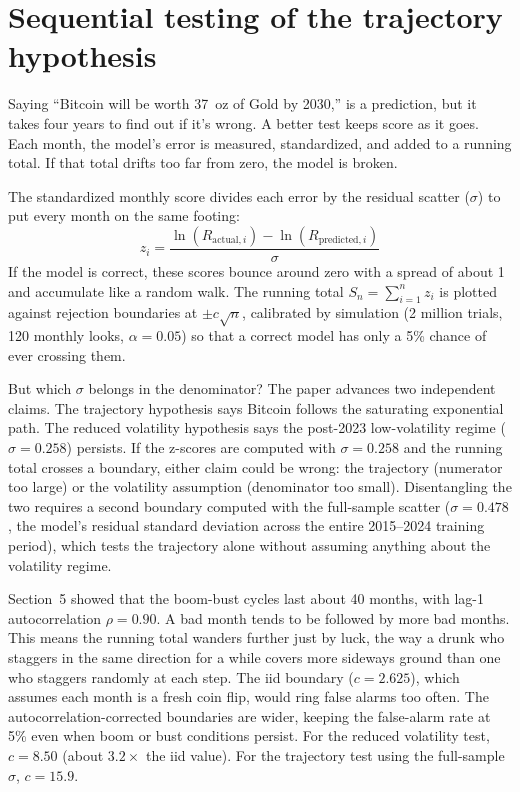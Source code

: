 \documentclass[11pt,letterpaper]{article}
\begin{document}
\section{Sequential testing of the trajectory hypothesis}

Saying ``Bitcoin will be worth 37~oz of Gold by 2030,'' is a prediction, but it takes four years to find out if it's wrong. A better test keeps score as it goes. Each month, the model's error is measured, standardized, and added to a running total. If that total drifts too far from zero, the model is broken.

The standardized monthly score divides each error by the residual scatter ($\sigma$) to put every month on the same footing:
\begin{equation}
z_i = \frac{\ln(R_{\text{actual},i}) - \ln(R_{\text{predicted},i})}{\sigma}
\label{eq:zscore}
\end{equation}
If the model is correct, these scores bounce around zero with a spread of about 1 and accumulate like a random walk. The running total $S_n = \sum_{i=1}^{n} z_i$ is plotted against rejection boundaries at $\pm c\sqrt{n}$, calibrated by simulation (2 million trials, 120 monthly looks, $\alpha = 0.05$) so that a correct model has only a 5\% chance of ever crossing them.

But which $\sigma$ belongs in the denominator? The paper advances two independent claims. The trajectory hypothesis says Bitcoin follows the saturating exponential path. The reduced volatility hypothesis says the post-2023 low-volatility regime ($\sigma = 0.258$) persists. If the z-scores are computed with $\sigma = 0.258$ and the running total crosses a boundary, either claim could be wrong: the trajectory (numerator too large) or the volatility assumption (denominator too small). Disentangling the two requires a second boundary computed with the full-sample scatter ($\sigma = 0.478$, the model's residual standard deviation across the entire 2015--2024 training period), which tests the trajectory alone without assuming anything about the volatility regime.

Section~5 showed that the boom-bust cycles last about 40 months, with lag-1 autocorrelation $\rho = 0.90$. A bad month tends to be followed by more bad months. This means the running total wanders further just by luck, the way a drunk who staggers in the same direction for a while covers more sideways ground than one who staggers randomly at each step. The iid boundary ($c = 2.625$), which assumes each month is a fresh coin flip, would ring false alarms too often. The autocorrelation-corrected boundaries are wider, keeping the false-alarm rate at 5\% even when boom or bust conditions persist. For the reduced volatility test, $c = 8.50$ (about $3.2\times$ the iid value). For the trajectory test using the full-sample $\sigma$, $c = 15.9$.
\end{document}
